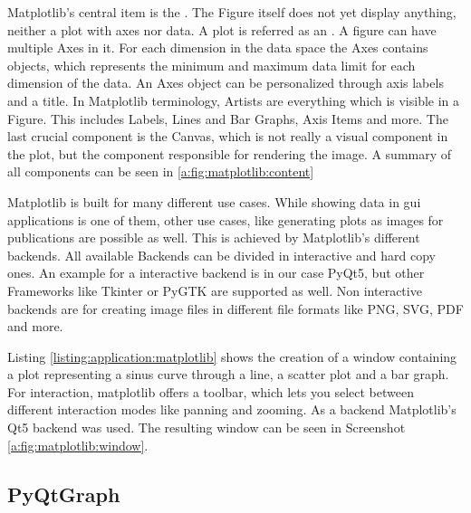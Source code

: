 Matplotlib's central item is the .
The Figure itself does not yet display anything, neither a plot with axes nor
data. A plot is referred as an . A
figure can have multiple Axes in it. For each dimension in the data space the
Axes contains  objects, which
represents the minimum and maximum data limit for each dimension of the data. An
Axes object can be personalized through axis labels and a title. In Matplotlib
terminology, Artists are everything which is visible in a Figure. This includes
Labels, Lines and Bar Graphs, Axis Items and more. The last crucial component is
the Canvas, which is not really a visual component in the plot, but the
component responsible for rendering the image. A summary of all components can
be seen in \ref{a:fig:matplotlib:content}

Matplotlib is built for many different use cases. While showing data in
\gls{gui} applications is one of them, other use cases, like generating plots as
images for publications are possible as well. This is achieved by Matplotlib's
different backends. All available Backends can be divided in interactive and
hard copy ones. An example for a interactive backend is in our case PyQt5, but
other Frameworks like Tkinter or PyGTK are supported as well. Non interactive
backends are for creating image files in different file formats like PNG, SVG,
PDF and more.
\cite{MatplotlibIntro, PythonDataVis}

Listing \ref{listing:application:matplotlib} shows the creation of a window
containing a plot representing a sinus curve through a line, a scatter plot and
a bar graph. For interaction, matplotlib offers a toolbar, which lets you select
between different interaction modes like panning and zooming. As a backend
Matplotlib's Qt5 backend was used.  The resulting window can be seen in
Screenshot \ref{a:fig:matplotlib:window}.



\subsection{PyQtGraph} \label{sec:application:libraries:pyqtgraph}

